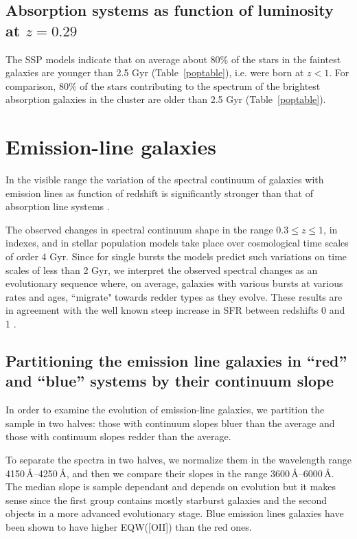 \documentclass[referee]{aa}
\begin{document}
\subsection{Absorption systems as function of luminosity at $z = 0.29$}

The SSP models indicate that on average about 80\% of the stars in the faintest galaxies are younger
than 2.5 Gyr (Table~\ref{poptable}), i.e. were born at $z < 1$. For comparison, 80\% of the stars contributing to the spectrum of the brightest
absorption galaxies in the cluster are older than 2.5 Gyr (Table~\ref{poptable}).

  
 \section{Emission-line galaxies}
\label{redsequenceem}

In the visible range the variation of the spectral 
continuum of galaxies with emission lines as function of redshift is significantly stronger than that of
absorption line systems . 

The observed changes in spectral continuum shape in the range $0.3 \leq z \leq 1$, 
in indexes, and in stellar population models take place over cosmological time scales of order 4 Gyr.
Since for single bursts the  models predict such 
variations on time scales \rm of less than 2 Gyr, we  interpret the observed
spectral changes  as an evolutionary sequence
where, on average, galaxies with various bursts at various rates and ages, ``migrate" towards redder types as they evolve.
These results are in agreement with the well known
steep increase in SFR between redshifts 0 and 1 
\citep{Pei:1995p5265, Lilly:1996p4401, Madau:1998p4392, Hopkins:2006p4265}.

\subsection{Partitioning the emission line galaxies in ``red'' and ``blue'' systems by their continuum slope}
\label{parti}

In order to examine the evolution of emission-line galaxies, we partition the sample
in two halves: those with continuum slopes  bluer than the average  and those with continuum 
slopes redder than the average.

To separate the spectra in two halves, we normalize them in the wavelength range
4150\,\AA--4250\,\AA, and then we compare their slopes  in the
range 3600\,\AA--6000\,\AA. The median slope is sample dependant and depends
on evolution but it makes sense since the first group contains
mostly starburst galaxies and the second objects in a more advanced evolutionary stage.
Blue emission lines galaxies have been shown to have higher EQW([OII]) than
the red ones.
\end{document}
